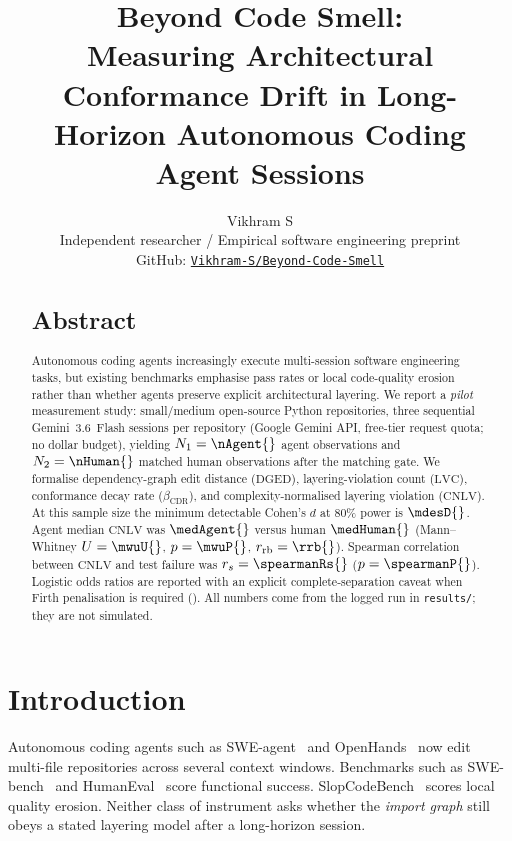 \documentclass[11pt,letterpaper,logo]{yalearxiv}
\title{Beyond Code Smell:\\ Measuring Architectural Conformance Drift in Long-Horizon Autonomous Coding Agent Sessions}
\author{Vikhram S\affilmark\\
\affilmark{} Independent researcher / Empirical software engineering preprint\\
GitHub: \href{https://github.com/Vikhram-S/Beyond-Code-Smell}{\texttt{Vikhram-S/Beyond-Code-Smell}}
}
\newcommand{\DGED}{\mathrm{DGED}}
\newcommand{\LVC}{\mathrm{LVC}}
\newcommand{\CNLV}{\mathrm{CNLV}}
\newcommand{\CDR}{\beta_{\mathrm{CDR}}}
\begin{document}
\begin{abstract}
\vspace{-1mm}
{\centering\section*{Abstract}}
Autonomous coding agents increasingly execute multi-session software engineering tasks, but existing benchmarks emphasise pass rates or local code-quality erosion rather than whether agents preserve explicit architectural layering. We report a \emph{pilot} measurement study: \nRepos{} small/medium open-source Python repositories, three sequential Gemini~3.6~Flash sessions per repository (Google Gemini API, free-tier request quota; no dollar budget), yielding $N_1=\nAgent{}$ agent observations and $N_2=\nHuman{}$ matched human observations after the matching gate. We formalise dependency-graph edit distance ($\DGED$), layering-violation count ($\LVC$), conformance decay rate ($\CDR$), and complexity-normalised layering violation ($\CNLV$). At this sample size the minimum detectable Cohen's $d$ at 80\% power is $\mdesD{}$. Agent median $\CNLV$ was $\medAgent{}$ versus human $\medHuman{}$ (Mann--Whitney $U=\mwuU{}$, $p=\mwuP{}$, $r_{\mathrm{rb}}=\rrb{}$). Spearman correlation between $\CNLV$ and test failure was $r_s=\spearmanRs{}$ ($p=\spearmanP{}$). Logistic odds ratios are reported with an explicit complete-separation caveat when Firth penalisation is required (\sepFlag{}). All numbers come from the logged run in \texttt{results/}; they are not simulated.
\end{abstract}

\maketitle

\section{Introduction}
\label{sec:intro}

Autonomous coding agents such as SWE-agent~\citep{yang2024sweagent} and OpenHands~\citep{wang2024openhands} now edit multi-file repositories across several context windows. Benchmarks such as SWE-bench~\citep{jimenez2024swebench} and HumanEval~\citep{chen2021humaneval} score functional success. SlopCodeBench~\citep{slopcodebench2026} scores local quality erosion. Neither class of instrument asks whether the \emph{import graph} still obeys a stated layering model after a long-horizon session.
\end{document}
